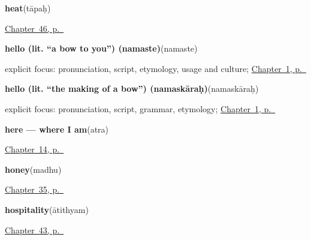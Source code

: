 \noindent\begin{minipage}[t]{\linewidth}
\raggedright
\textbf{heat}\enspace\emph{}\enspace(tāpaḥ)\par
\footnotesize \hyperref[ch:sa-sun-and-shade]{Chapter~46, p.~\pageref*{ch:sa-sun-and-shade}}
\end{minipage}\par\smallskip

\noindent\begin{minipage}[t]{\linewidth}
\raggedright
\textbf{hello (lit. \textquotedblleft{}a bow to you\textquotedblright{}) (namaste)}\enspace\emph{}\enspace(namaste)\par
\footnotesize explicit focus: pronunciation, script, etymology, usage and culture; \hyperref[ch:greetings]{Chapter~1, p.~\pageref*{ch:greetings}}
\end{minipage}\par\smallskip

\noindent\begin{minipage}[t]{\linewidth}
\raggedright
\textbf{hello (lit. \textquotedblleft{}the making of a bow\textquotedblright{}) (namaskāraḥ)}\enspace\emph{}\enspace(namaskāraḥ)\par
\footnotesize explicit focus: pronunciation, script, grammar, etymology; \hyperref[ch:greetings]{Chapter~1, p.~\pageref*{ch:greetings}}
\end{minipage}\par\smallskip

\noindent\begin{minipage}[t]{\linewidth}
\raggedright
\textbf{here — where I am}\enspace\emph{}\enspace(atra)\par
\footnotesize \hyperref[ch:sa-pointing-and-asking]{Chapter~14, p.~\pageref*{ch:sa-pointing-and-asking}}
\end{minipage}\par\smallskip

\noindent\begin{minipage}[t]{\linewidth}
\raggedright
\textbf{honey}\enspace\emph{}\enspace(madhu)\par
\footnotesize \hyperref[ch:sa-house]{Chapter~35, p.~\pageref*{ch:sa-house}}
\end{minipage}\par\smallskip

\noindent\begin{minipage}[t]{\linewidth}
\raggedright
\textbf{hospitality}\enspace\emph{}\enspace(ātithyam)\par
\footnotesize \hyperref[ch:sa-good-manners]{Chapter~43, p.~\pageref*{ch:sa-good-manners}}
\end{minipage}\par\smallskip

